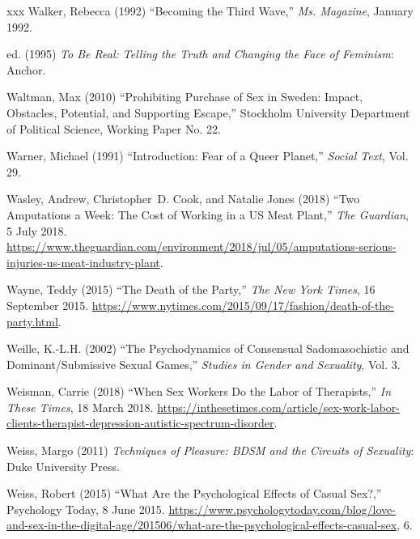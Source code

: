 \documentclass[]{jlreq} \usepackage{mystyle}
\begin{document}
\begin{thebibliography}{xxx}
Walker, Rebecca (1992) ``Becoming the Third Wave,'' \emph{Ms. Magazine},
  January 1992.

 \bysame{}  ed.  (1995)  \textit{ To Be Real: Telling the Truth and Changing
  the Face of Feminism}: Anchor.

Waltman, Max (2010) ``Prohibiting Purchase of Sex in Sweden: Impact, Obstacles,
  Potential, and Supporting Escape,'' Stockholm University Department of
  Political Science, Working Paper No. 22.

Warner, Michael (1991) ``Introduction: Fear of a Queer Planet,'' \textit{
  Social Text}, Vol. 29.

Wasley, Andrew, Christopher~D. Cook, and Natalie Jones (2018) ``Two Amputations
  a Week: The Cost of Working in a US Meat Plant,'' \emph{The Guardian}, 5 July
  2018.
  \url{https://www.theguardian.com/environment/2018/jul/05/amputations-serious-injuries-us-meat-industry-plant}.

Wayne, Teddy (2015) ``The Death of the Party,'' \emph{The New York Times}, 16
  September 2015.
  \url{https://www.nytimes.com/2015/09/17/fashion/death-of-the-party.html}.

Weille, K.-L.H. (2002) ``The Psychodynamics of Consensual Sadomasochistic and
  Dominant/Submissive Sexual Games,'' \textit{ Studies in Gender and
  Sexuality}, Vol. 3.

Weisman, Carrie (2018) ``When Sex Workers Do the Labor of Therapists,''
  \emph{In These Times}, 18 March 2018.
  \url{https://inthesetimes.com/article/sex-work-labor-clients-therapist-depression-autistic-spectrum-disorder}.

Weiss, Margo (2011)  \textit{ Techniques of Pleasure: BDSM and the Circuits of
  Sexuality}: Duke University Press.

Weiss, Robert (2015) ``What Are the Psychological Effects of Casual Sex?,''
  Psychology Today, 8 June 2015.
  \url{https://www.psychologytoday.com/blog/love-and-sex-in-the-digital-age/201506/what-are-the-psychological-effects-casual-sex},
  6.


\end{thebibliography}
\end{document}
